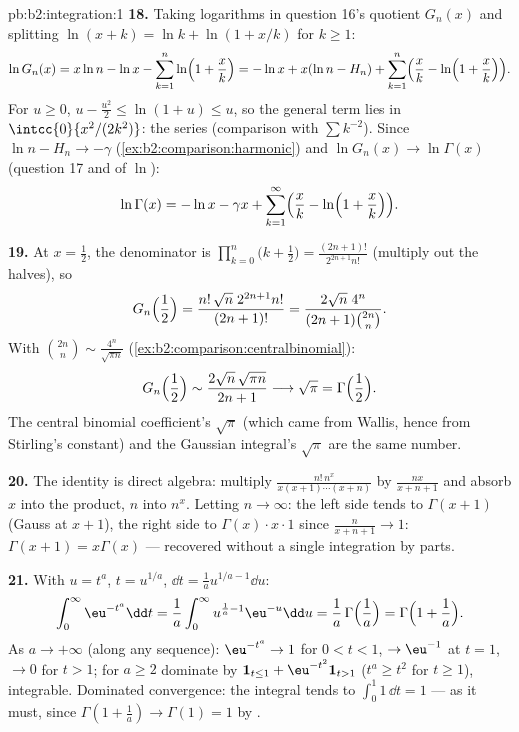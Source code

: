 \begin{solution}{pb:b2:integration:1}
\textbf{18.} Taking logarithms in question 16's quotient
$G_n(x)$ and splitting $\ln(x+k) = \ln k + \ln(1 + x/k)$ for $k
\geq 1$:
\[
\ln G_n(x) = x\ln n - \ln x - \sum_{k=1}^n
\ln\Bigl(1+\frac xk\Bigr)
= -\ln x + x(\ln n - H_n)
+ \sum_{k=1}^n\Bigl(\frac xk -
\ln\Bigl(1+\frac xk\Bigr)\Bigr).
\]
For $u \geq 0$, $u - \frac{u^2}2 \leq \ln(1+u) \leq u$, so the
general term lies in $\intcc{0}{x^2/(2k^2)}$: the series
 (comparison with $\sum k^{-2}$). Since $\ln n - H_n
\to -\gamma$ (\cref{ex:b2:comparison:harmonic}) and $\ln G_n(x)
\to \ln\Gamma(x)$ (question 17 and  of $\ln$):
\[
\ln\Gamma(x) = -\ln x - \gamma x
+ \sum_{k=1}^\infty\Bigl(\frac xk -
\ln\Bigl(1+\frac xk\Bigr)\Bigr) .
\]

\textbf{19.} At $x = \frac12$, the denominator is
$\prod_{k=0}^n\bigl(k+\frac12\bigr) =
\frac{(2n+1)!}{2^{2n+1}n!}$ (multiply out the halves), so
\[
G_n\Bigl(\frac12\Bigr)
= \frac{n!\,\sqrt n\;2^{2n+1}n!}{(2n+1)!}
= \frac{2\sqrt n\;4^n}{(2n+1)\binom{2n}{n}} .
\]
With $\binom{2n}{n} \sim \frac{4^n}{\sqrt{\pi n}}$
(\cref{ex:b2:comparison:centralbinomial}):
\[
G_n\Bigl(\frac12\Bigr)
\sim \frac{2\sqrt n\,\sqrt{\pi n}}{2n+1}
\longrightarrow \sqrt\pi = \Gamma\Bigl(\frac12\Bigr) .
\]
The central binomial coefficient's $\sqrt\pi$ (which came from
Wallis, hence from Stirling's constant) and the Gaussian
integral's $\sqrt\pi$ are the same number.

\textbf{20.} The identity is direct algebra: multiply
$\frac{n!\,n^x}{x(x+1)\cdots(x+n)}$ by $\frac{nx}{x+n+1}$ and
absorb $x$ into the product, $n$ into $n^x$. Letting $n \to
\infty$: the left side tends to $\Gamma(x+1)$ (Gauss at $x+1$),
the right side to $\Gamma(x)\cdot x\cdot 1$ since
$\frac{n}{x+n+1} \to 1$: $\Gamma(x+1) = x\Gamma(x)$ ---
recovered without a single integration by parts.

\textbf{21.} With $u = t^a$, $t = u^{1/a}$, $\dd t = \frac1a
u^{1/a - 1}\dd u$:
\[
\int_0^\infty \eu^{-t^a}\dd t
= \frac1a\int_0^\infty u^{\frac1a - 1}\eu^{-u}\dd u
= \frac1a\,\Gamma\Bigl(\frac1a\Bigr)
= \Gamma\Bigl(1 + \frac1a\Bigr) .
\]
As $a \to +\infty$ (along any sequence): $\eu^{-t^a} \to 1$ for
$0 < t < 1$, $\to \eu^{-1}$ at $t = 1$, $\to 0$ for $t > 1$;
for $a \geq 2$ dominate by $\mathbf 1_{t \leq 1} +
\eu^{-t^2}\mathbf 1_{t > 1}$ ($t^a \geq t^2$ for $t \geq 1$),
integrable. Dominated convergence: the integral tends to
$\int_0^1 1\,\dd t = 1$ --- as it must, since $\Gamma(1 +
\frac1a) \to \Gamma(1) = 1$ by .


\end{solution}
